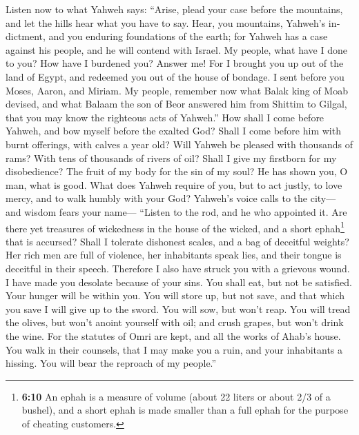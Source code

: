 \begin{paracol}{2}
\begin{otherlanguage}{english}
 Listen now to what Yahweh says: ``Arise, plead your case
before the mountains, and let the hills hear what you have to say.
 Hear, you mountains, Yahweh's indictment, and you
enduring foundations of the earth; for Yahweh has a case against his
people, and he will contend with Israel.  My people, what
have I done to you? How have I burdened you? Answer me! 
For I brought you up out of the land of Egypt, and redeemed you out of
the house of bondage. I sent before you Moses, Aaron, and Miriam.
 My people, remember now what Balak king of Moab devised,
and what Balaam the son of Beor answered him from Shittim to Gilgal,
that you may know the righteous acts of Yahweh.''  How
shall I come before Yahweh, and bow myself before the exalted God? Shall
I come before him with burnt offerings, with calves a year old?
 Will Yahweh be pleased with thousands of rams? With tens
of thousands of rivers of oil? Shall I give my firstborn for my
disobedience? The fruit of my body for the sin of my soul?
 He has shown you, O man, what is good. What does Yahweh
require of you, but to act justly, to love mercy, and to walk humbly
with your God?  Yahweh's voice calls to the city--- and
wisdom fears your name--- ``Listen to the rod, and he who appointed it.
 Are there yet treasures of wickedness in the house of
the wicked, and a short ephah\footnote{\textbf{6:10} An ephah is a
  measure of volume (about 22 liters or about 2/3 of a bushel), and a
  short ephah is made smaller than a full ephah for the purpose of
  cheating customers.} that is accursed?  Shall I
tolerate dishonest scales, and a bag of deceitful weights?
 Her rich men are full of violence, her inhabitants speak
lies, and their tongue is deceitful in their speech. 
Therefore I also have struck you with a grievous wound. I have made you
desolate because of your sins.  You shall eat, but not be
satisfied. Your hunger will be within you. You will store up, but not
save, and that which you save I will give up to the sword.
 You will sow, but won't reap. You will tread the olives,
but won't anoint yourself with oil; and crush grapes, but won't drink
the wine.  For the statutes of Omri are kept, and all the
works of Ahab's house. You walk in their counsels, that I may make you a
ruin, and your inhabitants a hissing. You will bear the reproach of my
people.''


\end{otherlanguage}
\end{paracol}
